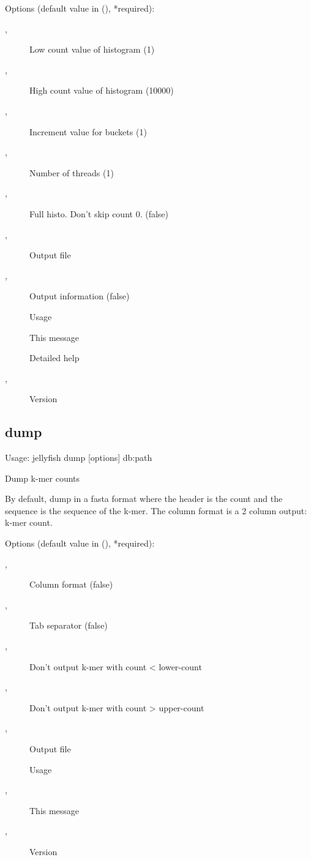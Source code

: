 \noindent Options (default value in (), *required):
\begin{description}
\item[,] \noindent Low count value of histogram (1)
\item[,] \noindent High count value of histogram (10000)
\item[,] \noindent Increment value for buckets (1)
\item[,] \noindent Number of threads (1)
\item[,] \noindent Full histo. Don't skip count 0. (false)
\item[,] \noindent Output file
\item[,] \noindent Output information (false)
\item[] \noindent Usage
\item[] \noindent This message
\item[] \noindent Detailed help
\item[,] \noindent Version
\end{description}

\subsection{dump}
\noindent Usage: jellyfish dump [options] db:path

\noindent Dump k-mer counts

\noindent By default, dump in a fasta format where the header is the count and
\noindent the sequence is the sequence of the k-mer. The column format is a 2
\noindent column output: k-mer count.

\noindent Options (default value in (), *required):
\begin{description}
\item[,] \noindent Column format (false)
\item[,] \noindent Tab separator (false)
\item[,] \noindent Don't output k-mer with count < lower-count
\item[,] \noindent Don't output k-mer with count > upper-count
\item[,] \noindent Output file
\item[] \noindent Usage
\item[,] \noindent This message
\item[,] \noindent Version
\end{description}

